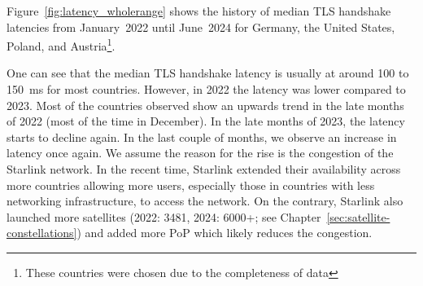 Figure~\ref{fig:latency_wholerange} shows the history of median TLS handshake
latencies from January~2022 until June~2024 for Germany, the United States,
Poland, and Austria\footnote{These countries were chosen due to the
	completeness of data}.

One can see that the median TLS handshake latency is usually at around 100 to 150~ms for most
countries. However, in 2022 the latency was lower compared to 2023. Most of the
countries observed show an upwards trend in the late months of 2022 (most of
the time in December). In the late months of 2023, the latency starts to
decline again. In the last couple of months, we observe an increase in latency
once again. We assume the reason for the rise is the congestion of the Starlink
network. In the recent time, Starlink extended their availability across more
countries allowing more users, especially those in countries with less
networking infrastructure, to access the network. On the contrary, Starlink
also launched more satellites (2022: 3481, 2024: 6000+; see
Chapter~\ref{sec:satellite-constellations}) and added more \ac{PoP} which
likely reduces the congestion.

